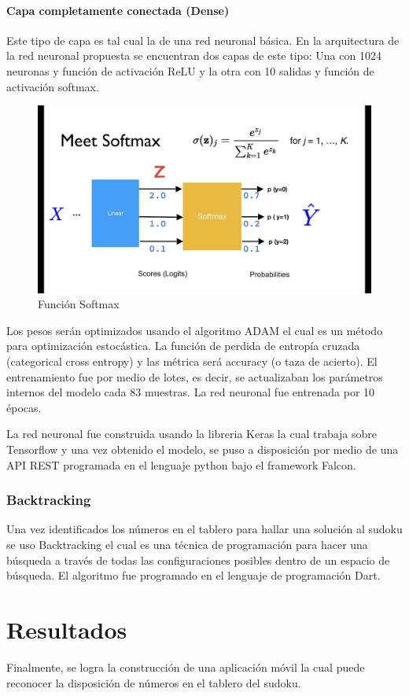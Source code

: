 \documentclass{article}
\begin{document}
\paragraph{Capa completamente conectada (Dense)} Este tipo de capa es tal cual la de una red neuronal b\'asica. En la arquitectura de la red neuronal propuesta se encuentran dos capas de este tipo: Una con 1024 neuronas y funci\'on de activaci\'on ReLU y la otra con 10 salidas y funci\'on de activaci\'on softmax.
\begin{figure}[H]
  \caption{Funci\'on Softmax}
  \centering 
  \includegraphics[scale=.30]{softmax}
\end{figure}

Los pesos ser\'an optimizados usando el algoritmo ADAM el cual es un m\'etodo para optimizaci\'on estoc\'astica. La funci\'on de perdida de entrop\'ia cruzada (categorical cross entropy) y las m\'etrica ser\'a accuracy (o taza de acierto).
El entrenamiento fue por medio de lotes, es decir, se actualizaban los par\'ametros internos del modelo cada 83 muestras. La red neuronal fue entrenada por 10 \'epocas.

La red neuronal fue construida usando la libreria Keras la cual trabaja sobre Tensorflow y una vez obtenido el modelo, se puso a disposici\'on por medio de una API REST programada en el lenguaje python bajo el framework Falcon.
\subsubsection{Backtracking}
Una vez identificados los n\'umeros en el tablero para hallar una soluci\'on al sudoku se uso Backtracking el cual es una t\'ecnica de programaci\'on para hacer una b\'usqueda a trav\'es de todas las configuraciones posibles dentro de un espacio de b\'usqueda.
El algoritmo fue programado en el lenguaje de programaci\'on Dart.
\section{Resultados}
Finalmente, se logra la construcci\'on de una aplicaci\'on m\'ovil la cual puede reconocer la disposici\'on de n\'umeros en el tablero del sudoku.


    
\end{document}
